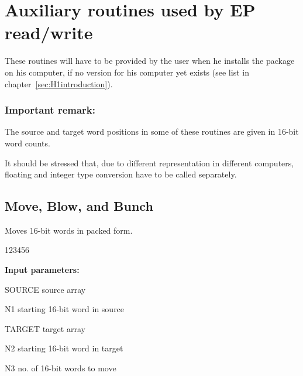 
\chapter{Auxiliary routines used by EP read/write}
\label{sec:H1Auxiliaryroutines}

These routines will have to be provided by the user when  he
installs the package on his computer, if no version for his computer yet
exists (see list in chapter~\ref{sec:H1introduction}).

\subsection*{Important remark:}

The source and target word positions in some of these routines
are given in 16-bit word counts.
 
It should be stressed that, due to different representation in different
computers, floating and integer type conversion have to be called
separately.

\section{Move, Blow, and Bunch}

 
Moves 16-bit words in packed form.
 
\begin{DLtt}{123456}
\item[{\rm\bf Input parameters:}]
\item[SOURCE] source array
\item[N1]     starting 16-bit word in source
\item[TARGET] target array
\item[N2]     starting 16-bit word in target
\item[N3]     no. of 16-bit words to move
\end{DLtt}

